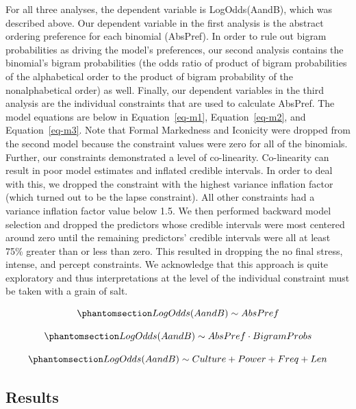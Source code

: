 \documentclass[
  12pt,
  letterpaper,
]{scrreport}
\begin{document}
For all three analyses, the dependent variable is LogOdds(AandB), which
was described above. Our dependent variable in the first analysis is the
abstract ordering preference for each binomial (AbsPref). In order to
rule out bigram probabilities as driving the model's preferences, our
second analysis contains the binomial's bigram probabilities (the odds
ratio of product of bigram probabilities of the alphabetical order to
the product of bigram probability of the nonalphabetical order) as well.
Finally, our dependent variables in the third analysis are the
individual constraints that are used to calculate AbsPref. The model
equations are below in Equation~\ref{eq-m1}, Equation~\ref{eq-m2}, and
Equation~\ref{eq-m3}. Note that Formal Markedness and Iconicity were
dropped from the second model because the constraint values were zero
for all of the binomials. Further, our constraints demonstrated a level
of co-linearity. Co-linearity can result in poor model estimates and
inflated credible intervals. In order to deal with this, we dropped the
constraint with the highest variance inflation factor (which turned out
to be the lapse constraint). All other constraints had a variance
inflation factor value below 1.5. We then performed backward model
selection and dropped the predictors whose credible intervals were most
centered around zero until the remaining predictors' credible intervals
were all at least 75\% greater than or less than zero. This resulted in
dropping the no final stress, intense, and percept constraints. We
acknowledge that this approach is quite exploratory and thus
interpretations at the level of the individual constraint must be taken
with a grain of salt.

\begin{equation}\phantomsection\label{eq-m1}{
LogOdds(AandB) \sim AbsPref
}\end{equation}

\begin{equation}\phantomsection\label{eq-m2}{
LogOdds(AandB) \sim AbsPref \cdot BigramProbs
}\end{equation}

\begin{equation}\phantomsection\label{eq-m3}{
LogOdds(AandB) \sim Culture + Power + Freq + Len
}\end{equation}

\subsection{Results}\label{results-6}
\end{document}
